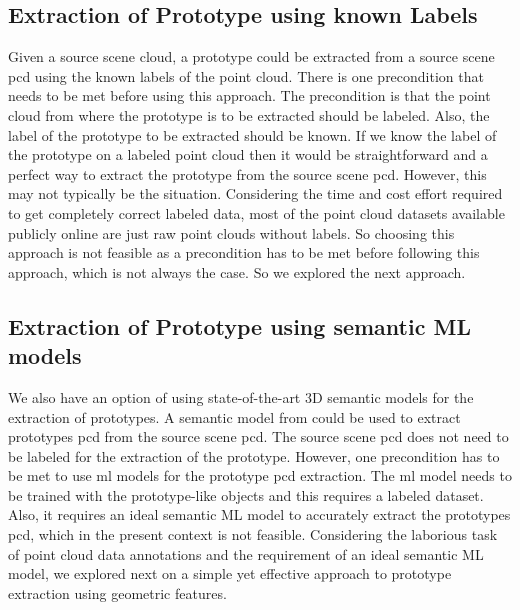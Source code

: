 \subsection{Extraction of Prototype using known Labels}
Given a source scene cloud, a prototype could be extracted from a source scene \acrshort{pcd} using the known labels of the point cloud. There is one precondition that needs to be met before using this approach. The precondition is that the point cloud from where the prototype is to be extracted should be labeled. Also, the label of the prototype to be extracted should be known. If we know the label of the prototype on a labeled point cloud then it would be straightforward and a perfect way to extract the prototype from the source scene \acrshort{pcd}. However, this may not typically be the situation. Considering the time and cost effort required to get completely correct labeled data, most of the point cloud datasets available publicly online are just raw point clouds without labels. So choosing this approach is not feasible as a precondition has to be met before following this approach, which is not always the case. So we explored the next approach.

\subsection{Extraction of Prototype using semantic ML models}
We also have an option of using state-of-the-art 3D semantic models for the extraction of prototypes. A semantic model from \parencite{Chen2022} could be used to extract prototypes \acrshort{pcd} from the source scene \acrshort{pcd}. The source scene \acrshort{pcd} does not need to be labeled for the extraction of the prototype. However, one precondition has to be met to use \acrfull{ml} models for the prototype \acrshort{pcd} extraction. The \acrshort{ml} model needs to be trained with the prototype-like objects and this requires a labeled dataset. Also, it requires an ideal semantic ML model to accurately extract the prototypes \acrshort{pcd}, which in the present context is not feasible. Considering the laborious task of point cloud data annotations and the requirement of an ideal semantic ML model, we explored next on a simple yet effective approach to prototype extraction using geometric features.

